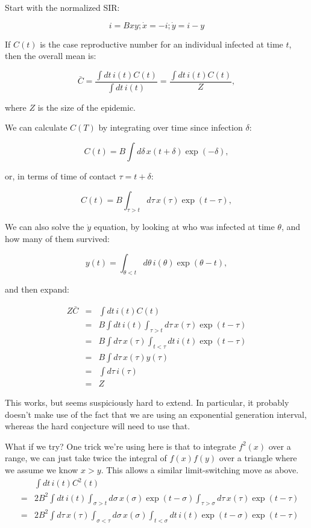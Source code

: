 \documentclass[12pt]{article}
\begin{document}
Start with the normalized SIR:

$$ i = Bxy; \dot x = -i; \dot y = i-y $$

If $C(t)$ is the case reproductive number for an individual infected at time $t$, then the overall mean is:

$$
	\bar C 
	= \frac{\int{dt\, i(t) C(t)}}{\int{dt\, i(t)}}
	= \frac{\int{dt\, i(t) C(t)}}{Z}, 
$$

where $Z$ is the size of the epidemic.

We can calculate $C(T)$ by integrating over time since infection $\delta$:

$$C(t) = B \int{d\delta\, x(t+\delta) \exp(-\delta)}, $$

or, in terms of time of contact $\tau=t+\delta$:

$$C(t) = B \int_{\tau>t}{d\tau\, x(\tau) \exp(t-\tau)}, $$

We can also solve the $\dot y$ equation, by looking at who was infected at time $\theta$, and how many of them survived:

$$ y(t) = \int_{\theta<t}{d\theta\, i(\theta)\exp(\theta-t)},$$

and then expand:

\begin{eqnarray}
	Z \bar C
	&=& \int{dt\, i(t) C(t)}
	\\ &=& B \int{dt\, i(t) \int_{\tau>t}{d\tau\, x(\tau) \exp(t-\tau)}}
	\\ &=& B \int{d\tau\, x(\tau) \int_{t<\tau}dt\, i(t) \exp(t-\tau)}
	\\ &=& B \int{d\tau\, x(\tau) y(\tau)}
	\\ &=& \int{d\tau\, i(\tau)}
	\\ &=& Z
\end{eqnarray}

This works, but seems suspiciously hard to extend. In particular, it probably doesn't make use of the fact that we are using an exponential generation interval, whereas the hard conjecture will need to use that.

What if we try? One trick we're using here is that to integrate $f^2(x)$ over a range, we can just take twice the integral of $f(x)f(y)$ over a triangle where we assume we know $x>y$. This allows a similar limit-switching move as above.
\begin{eqnarray}
	&& \int{dt\, i(t) C^2(t)}
	\\ &=& 2B^2 \int{dt\, i(t) \int_{\sigma>t}{d\sigma\, x(\sigma) \exp(t-\sigma)}}
		\int_{\tau>\sigma}{d\tau\, x(\tau) \exp(t-\tau)}
	\\ &=& 2B^2 \int{d\tau\, x(\tau)}
		\int_{\sigma<\tau}{d\sigma\, x(\sigma)}
		\int_{t<\sigma}{dt\, i(t) \exp(t-\sigma) \exp(t-\tau)}
\end{eqnarray}
\end{document}
